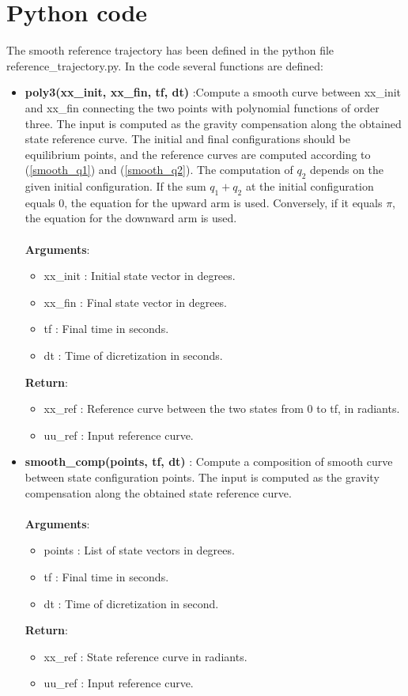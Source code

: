 \section*{Python code}

The smooth reference trajectory has been defined in the python file reference\_trajectory.py. In the code several functions are defined:

\begin{itemize}
    \item \textbf{poly3(xx\_init, xx\_fin, tf, dt) }:Compute a smooth curve between xx\_init and xx\_fin connecting the two points with polynomial functions of order three. The input is computed as the gravity compensation along the obtained state reference curve. The initial and final configurations should be equilibrium points, and the reference curves are computed according to (\ref{smooth_q1}) and (\ref{smooth_q2}). The computation of $q_2$ depends on the given initial configuration. If the sum $q_1 + q_2$ at the initial configuration equals $0$, the equation for the upward arm is used. Conversely, if it equals $\pi$, the equation for the downward arm is used.  \\\\
    \textbf{Arguments}:
    \begin{itemize}
        \item xx\_init : Initial state vector in degrees.
        \item xx\_fin : Final state vector in degrees.
        \item tf : Final time in seconds.
        \item dt : Time of dicretization in seconds.
    \end{itemize}
    \textbf{Return}:
    \begin{itemize}
        \item xx\_ref : Reference curve between the two states from 0 to tf, in radiants.
        \item uu\_ref : Input reference curve.
    \end{itemize}
    
    \item \textbf{smooth\_comp(points, tf, dt) }: Compute a composition of smooth curve between state configuration points. The input is computed as the gravity compensation along the obtained state reference curve.\\\\
    \textbf{Arguments}:
    \begin{itemize}
        \item points : List of state vectors in degrees.
        \item tf : Final time in seconds.
        \item dt : Time of dicretization in second.
    \end{itemize}
    \textbf{Return}:
    \begin{itemize}
        \item xx\_ref : State reference curve in radiants.
        \item uu\_ref : Input reference curve.
    \end{itemize}


\end{itemize}
